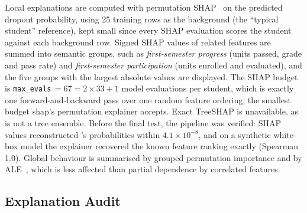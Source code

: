 Local explanations are computed with permutation SHAP~\citep{lundberg2017shap} on the predicted
dropout probability, using 25 training rows as the background (the ``typical student'' reference), kept small since
every SHAP evaluation scores the student against each background row.
Signed SHAP values of related features are summed into semantic groups, such as
\emph{first-semester progress} (units passed, grade and pass rate) and \emph{first-semester
participation} (units enrolled and evaluated), and the five groups with the largest absolute values
are displayed. The SHAP budget is \texttt{max\_evals}$\,=67=2\times 33+1$ model evaluations per
student, which is exactly one forward-and-backward pass over one random feature ordering, the
smallest budget shap's permutation explainer accepts. Exact TreeSHAP is
unavailable, as \tabicl is not a tree ensemble. Before the final test, the pipeline was verified:
SHAP values reconstructed \tabicl's probabilities within $4.1\times10^{-8}$, and on a synthetic
white-box model the explainer recovered the known feature ranking exactly (Spearman 1.0). Global
behaviour is summarised by grouped permutation importance and by ALE~\citep{apley2020ale}, which is
less affected than partial dependence by correlated features.

\subsection{Explanation Audit}

